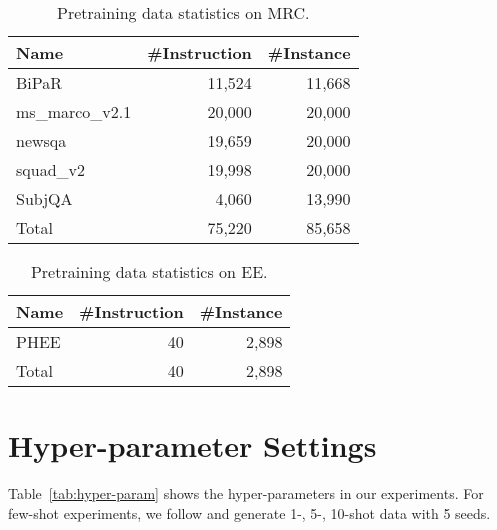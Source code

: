 \begin{table}
    \centering
    \begin{tabular}[]{lrr}
        \toprule
        Name & \#Instruction & \#Instance \\
        \midrule
        BiPaR & 11,524 & 11,668 \\
        ms\_marco\_v2.1 & 20,000 & 20,000 \\
        newsqa & 19,659 & 20,000 \\
        squad\_v2 & 19,998 & 20,000 \\
        SubjQA & 4,060 & 13,990 \\
        \midrule
        Total & 75,220 & 85,658 \\
        \bottomrule
    \end{tabular}
    \caption{
        Pretraining data statistics on MRC.
    }
    \label{tab:data-statistics-mrc}
\end{table}

\begin{table}
    \centering
    \begin{tabular}[]{lrr}
        \toprule
        Name & \#Instruction & \#Instance \\
        \midrule
        PHEE & 40 & 2,898 \\
        \midrule
        Total & 40 & 2,898 \\
        \bottomrule
    \end{tabular}
    \caption{
        Pretraining data statistics on EE.
    }
    \label{tab:data-statistics-ee}
\end{table}


\section{Hyper-parameter Settings}
\label{sec:app-hyper-param}

Table~\ref{tab:hyper-param} shows the hyper-parameters in our experiments.
For few-shot experiments, we follow \citet{uie} and generate 1-, 5-, 10-shot data with 5 seeds.

